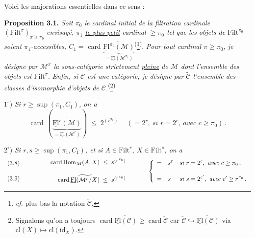 \documentclass[11pt]{article}
\newcommand{\msp}[1]{\marginpar{\footnotesize [#1]}}
\newcommand{\uFl}{\underline{\mathrm{Fl}}}
\newcommand{\cM}{\mathcal{M}}
\newcommand{\Filt}{\mathrm{Filt}}
\newcommand{\card}{\operatorname{card}}
\newcommand{\pfn}[2]{\textsuperscript{(}\footnote[#1]{#2}\textsuperscript{)}}
\begin{document}
\msp{page 19}

Voici les majorations essentielles dans ce sens :

\textbf{Proposition 3.1.} \textit{Soit $\pi_0$ le cardinal initial de la filtration cardinale} $(\Filt^\pi)_{\pi\geq\pi_0}$ \textit{envisagé, $\pi_1$ \underline{le plus petit} cardinal $\geq\pi_0$ tel que les objets de} $\Filt^{\pi_0}$ \textit{soient $\pi_1$-accessibles, $C_1=$} card $\underbrace{\widetilde{\uFl^{\pi_1}(\cM)}}_{=\uFl(\cM^{\pi_1})}$\pfn{4}{\textit{cf.} plus bas la notation $\widetilde{\mathcal{C}}$.}. \textit{Pour tout cardinal $\pi\geq\pi_0$, je désigne par $\cM^\pi$ la sous-catégorie strictement \underline{pleine} de $\cM$ dont l'ensemble des objets est} $\Filt^\pi$. \textit{Enfin, si $\mathcal{C}$ est une catégorie, je désigne par $\widetilde{\mathcal{C}}$ l'ensemble des classes d'isomorphie d'objets de $\mathcal{C}$.}\pfn{5}{Signalons qu'on a toujours $\card\widetilde{\uFl(\mathcal{C})}\geq\card\widetilde{\mathcal{C}}$ car $\widetilde{\mathcal{C}}\hookrightarrow\widetilde{\uFl(\mathcal{C})}$ via $\mathrm{cl}(X)\longmapsto\mathrm{cl}(\mathrm{id}_X)$.}

$1^\circ$) \textit{Si $r\geq\sup(\pi_1,C_1)$, on a}
\[
\card\,(\underbrace{\widetilde{\uFl^r(\cM)}}_{=\uFl(\cM^r)}) \;\leq\; 2^{(r^{\pi_0})} \quad\ (=2^r,\ \textit{si } r=2^c,\ \textit{avec } c\geq\pi_0)\,.
\tag*{(3.7)}
\]

$2^\circ$) \textit{Si $r,s\geq\sup(\pi_1,C_1)$, et si $A\in\Filt^r$, $X\in\Filt^s$, on a}
\[
\begin{array}{l}
\text{(3.8)}\\[3ex]
\text{(3.9)}
\end{array}
\qquad\qquad
\begin{array}{r@{\;\;\leq\;\;}l}
\card\mathrm{Hom}_{\cM}(A,X) & s^{(r^{\pi_0})}\\[3ex]
\card\widetilde{\uFl(\cM^r/X)} & s^{(r^{\pi_0})}
\end{array}
\qquad\quad
\left\{
\begin{array}{lll}
= & s^r & \textit{si } r=2^c,\ \textit{avec } c\geq\pi_0\,,\\[3ex]
= & s & \textit{si } s=2^{c'},\ \textit{avec } c'\geq r^{\pi_0}\,.
\end{array}
\right.
\]
\end{document}
